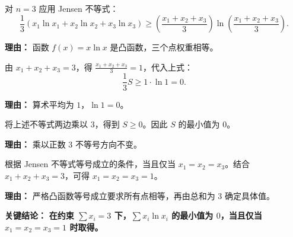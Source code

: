 \begin{examplebox}
\begin{description}[style=nextline, leftmargin=2.8em, labelsep=0.5em, itemsep=0.45em]
    \item[\textbf{第二步（应用多元形式）：}] 对 $n=3$ 应用 Jensen 不等式：
    \[
    \frac{1}{3}(x_1\ln x_1 + x_2\ln x_2 + x_3\ln x_3) \ge \left(\frac{x_1+x_2+x_3}{3}\right) \ln\!\left(\frac{x_1+x_2+x_3}{3}\right).
    \]
    \par\textbf{理由：}
    函数 $f(x)=x\ln x$ 是凸函数，三个点权重相等。

    \item[\textbf{第三步（代入约束化简）：}] 由 $x_1+x_2+x_3=3$，得 $\frac{x_1+x_2+x_3}{3}=1$，代入上式：
    \[
    \frac{1}{3}S \ge 1 \cdot \ln 1 = 0.
    \]
    \par\textbf{理由：}
    算术平均为 $1$，$\ln 1 = 0$。

    \item[\textbf{第四步（得到最小值）：}] 将上述不等式两边乘以 $3$，得到 $S \ge 0$。因此 $S$ 的最小值为 $0$。
    \par\textbf{理由：}
    乘以正数 $3$ 不等号方向不变。

    \item[\textbf{第五步（取等条件）：}] 根据 Jensen 不等式等号成立的条件，当且仅当 $x_1 = x_2 = x_3$。结合 $x_1+x_2+x_3=3$，可得 $x_1=x_2=x_3=1$。
    \par\textbf{理由：}
    严格凸函数等号成立要求所有点相等，再由总和为 $3$ 确定具体值。
\end{description}

\textbf{\textcolor{CExample}{关键结论：}} \textbf{在约束 $\sum x_i = 3$ 下，$\sum x_i\ln x_i$ 的最小值为 $0$，当且仅当 $x_1=x_2=x_3=1$ 时取得。}
\end{examplebox}
